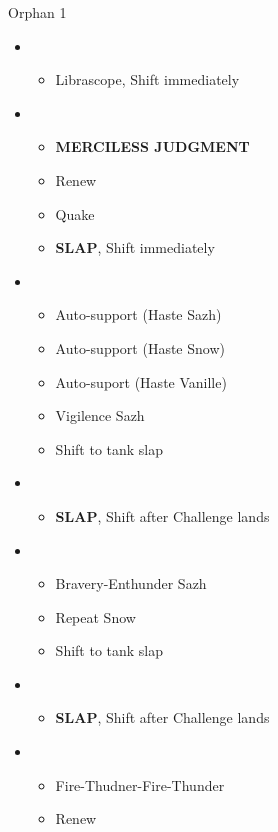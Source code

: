 \begin{battle}{Orphan 1}
\begin{multicols}{2}
\begin{itemize}
    \item \second
    \begin{itemize}
        \item Librascope, Shift immediately
    \end{itemize}
    \item \third
    \begin{itemize}
        \item \textbf{MERCILESS JUDGMENT}
        \item Renew
        \item Quake
        \item \textbf{SLAP}, Shift immediately
    \end{itemize}
    \item \fourth
    \begin{itemize}
        \item Auto-support (Haste Sazh)
        \item Auto-support (Haste Snow)
        \item Auto-suport (Haste Vanille)
        \item Vigilence Sazh
        \item Shift to tank slap
    \end{itemize}
    \item \third
    \begin{itemize}
        \item \textbf{SLAP}, Shift after Challenge lands
    \end{itemize}
    \item \fourth
    \begin{itemize}
        \item Bravery-Enthunder Sazh
        \item Repeat Snow
        \item Shift to tank slap
    \end{itemize}
    \item \third
    \begin{itemize}
        \item \textbf{SLAP}, Shift after Challenge lands
    \end{itemize}
    \item \fifth
    \begin{itemize}
        \item Fire-Thudner-Fire-Thunder
        \item Renew

\end{itemize}
\end{itemize}
\end{multicols}
\end{battle}
